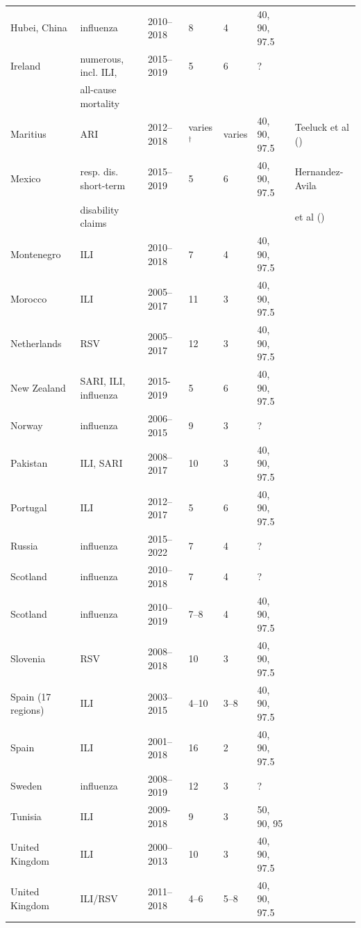 \documentclass{article}
\begin{document}
\begin{table}[h!]
\begin{tabular}{l l l l l l l}
Hubei, China & influenza & 2010--2018 & 8 & 4 & 40, 90, 97.5 & \cite{Jiang2022} \\
Ireland & numerous, incl. ILI, & 2015--2019 & 5 & 6 & ? & \cite{Domegan2022}\\
& all-cause mortality\\
Maritius & ARI & 2012--2018 & varies$^\dagger$ & varies & 40, 90, 97.5 & Teeluck et al (\citeyear{Teeluck2021}) \\
Mexico & resp. dis. short-term& 2015--2019 & 5 & 6 & 40, 90, 97.5 & Hernandez-Avila\\
& disability claims & & & & & et al (\citeyear{HernandezAvila2022})\\
Montenegro & ILI & 2010--2018 & 7 & 4 & 40, 90, 97.5 & \cite{Rakocevic2019}\\
Morocco & ILI & 2005--2017 & 11 & 3 & 40, 90, 97.5 & \cite{Rguig2020}\\
Netherlands & RSV & 2005--2017 & 12 & 3 & 40, 90, 97.5 & \cite{Vos2019}\\
New Zealand & SARI, ILI, influenza & 2015-2019 & 5 & 6 & 40, 90, 97.5 & \cite{Wood2021}\\
Norway & influenza & 2006--2015 & 9 & 3 & ? & \cite{Benedetti2019}\\
Pakistan & ILI, SARI & 2008--2017 & 10 & 3 & 40, 90, 97.5 & \cite{Nisar2020}\\
Portugal & ILI & 2012--2017 & 5 & 6 & 40, 90, 97.5 & \cite{Pascoa2018}\\
Russia & influenza & 2015--2022 & 7 & 4 & ? & \cite{Sominina2022}\\
Scotland & influenza & 2010--2018 & 7 & 4 & ? & \cite{Murray2018}\\
Scotland & influenza & 2010--2019 & 7--8 & 4 & 40, 90, 97.5 & \cite{Dickson2020}\\
Slovenia & RSV & 2008--2018 & 10 & 3 & 40, 90, 97.5 & \cite{Grilc2021}\\
Spain (17 regions) & ILI & 2003--2015 & 4--10 & 3--8 & 40, 90, 97.5 & \cite{Bangert2017}\\
Spain & ILI & 2001--2018 & 16 & 2 & 40, 90, 97.5 & \cite{RedondoBravo2020}\\
Sweden & influenza & 2008--2019 & 12 & 3 & ? & \cite{Spreco2020}\\
Tunisia & ILI & 2009-2018 & 9 & 3 & 50, 90, 95 & \cite{Bouguerra2020}\\
United Kingdom & ILI & 2000--2013 & 10 & 3 & 40, 90, 97.5 & \cite{Green2015}\\
United Kingdom & ILI/RSV & 2011--2018 & 4--6 & 5--8 & 40, 90, 97.5 & \cite{Harcourt2019}\\

\end{tabular}
\end{table}
\end{document}
